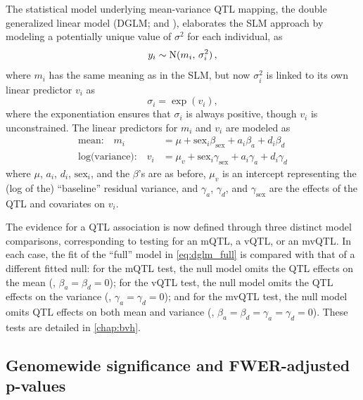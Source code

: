     The statistical model underlying mean-variance QTL mapping, the double generalized linear model (DGLM; \citealt{Smyth1989} and \citealt{Ronnegard2011a}), elaborates the SLM approach by modeling a potentially unique value of $\sigma^2$ for each individual, as
    \[
        y_i \sim \mathrm{N}(m_i, \,\sigma_i^2)\,,
    \]
    where $m_i$ has the same meaning as in the SLM, but now $\sigma^2_i$ is linked to its own linear predictor $v_i$ as
    \[
        \sigma_i = \exp(v_i),
    \]
    where the exponentiation ensures that $\sigma_i$ is always positive, though $v_i$ is unconstrained.
    The linear predictors for $m_i$ and $v_i$ are modeled as
    \begin{equation}\label{eq:dglm_full}
    \begin{aligned}
        \text{mean:~~~} m_i &= \mu + \text{sex}_i\beta_\text{sex} + a_i\beta_a + d_i\beta_d\\
        \text{log(variance):~~~} v_i &=  \mu_v + \text{sex}_i\gamma_\text{sex} + a_i\gamma_a + d_i\gamma_d
    \end{aligned}
    \end{equation}
    where $\mu$, $a_i$, $d_i$, $\text{sex}_i$, and the $\beta$'s are as before,
    $\mu_v$ is an intercept representing the (log of the) ``baseline'' residual variance, and $\gamma_a$, $\gamma_d$, and $\gamma_\text{sex}$ are the effects of the QTL and covariates on $v_i$.

    The evidence for a QTL association is now defined through three distinct model comparisons, corresponding to testing for an mQTL, a vQTL, or an mvQTL.
    In each case, the fit of the ``full'' model in \autoref{eq:dglm_full} is compared with that of a different fitted null: for the mQTL test, the null model omits the QTL effects on the mean (\ie, $\beta_a=\beta_d=0$); for the vQTL test, the null model omits the QTL effects on the variance (\ie, $\gamma_a=\gamma_d=0$); and for the mvQTL test, the null model omits QTL effects on both mean and variance (\ie, $\beta_a=\beta_d=\gamma_a=\gamma_d=0$).
    These tests are detailed in \autoref{chap:bvh}.


\subsection{Genomewide significance and FWER-adjusted p-values}

